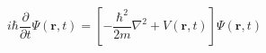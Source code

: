 \documentclass{article}
\begin{document}
\[
  i\hbar \frac{\partial}{\partial t} \Psi(\mathbf{r}, t)
  = \left[ -\frac{\hbar^{2}}{2m} \nabla^{2} + V(\mathbf{r}, t) \right] \Psi(\mathbf{r}, t)
\]
\end{document}
